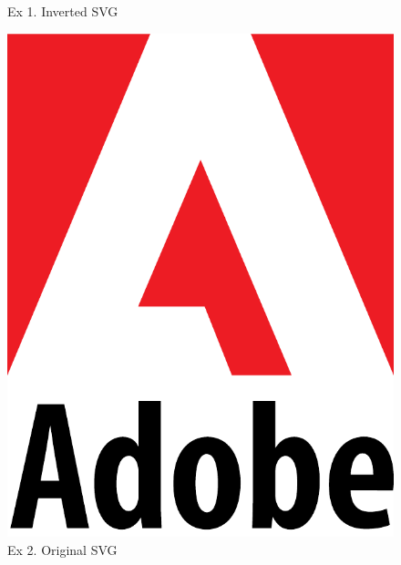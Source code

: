 \documentclass[12pt]{article}
\begin{document}
\begin{figure}[ht]
\begin{minipage}[b]{0.441\textwidth}
		\caption{Ex 1. Inverted SVG}
	\end{minipage}
\end{figure}

\begin{figure}[ht]
	\centering
	\begin{minipage}[b]{0.441\textwidth}
		\includegraphics[width=\textwidth]{./pdf/ex3-light.pdf}
		\caption{Ex 2. Original SVG}
	\end{minipage}
	\hfill
	\begin{minipage}[b]{0.441\textwidth}

\end{minipage}
\end{figure}
\end{document}
